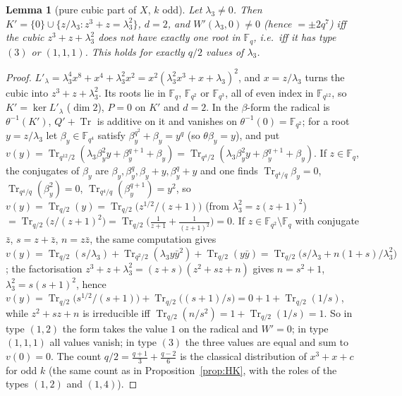 \documentclass[11pt,a4paper]{amsart}
\newtheorem{lemma}[theorem]{Lemma}
\theoremstyle{definition}
\newcommand{\F}{\mathbb{F}}
\newcommand{\Tr}{\operatorname{Tr}}
\begin{document}
\begin{lemma}[pure cubic part of $X$, $k$ odd]\label{lem:Wpcubic}
Let $\lambda_3\ne0$. Then $K'=\{0\}\cup\{z/\lambda_3:z^3+z=\lambda_3^2\}$, $d=2$, and $W'(\lambda_3,0)\ne0$ (hence $=\pm2q^7$) iff the cubic $z^3+z+\lambda_3^2$ does \emph{not} have exactly one root in $\F_q$, i.e.\ iff it has type $(3)$ or $(1,1,1)$. This holds for exactly $q/2$ values of $\lambda_3$.
\end{lemma}
\begin{proof}
$L'_\lambda=\lambda_3^4x^8+x^4+\lambda_3^2x^2=x^2(\lambda_3^2x^3+x+\lambda_3)^2$, and $x=z/\lambda_3$ turns the cubic into $z^3+z+\lambda_3^2$. Its roots lie in $\F_q$, $\F_{q^2}$ or $\F_{q^3}$, all of even index in $\F_{q^{12}}$, so $K'=\ker L'_\lambda$ ($\dim2$), $P=0$ on $K'$ and $d=2$. In the $\beta$-form the radical is $\theta^{-1}(K')$, $Q'+\Tr$ is additive on it and vanishes on $\theta^{-1}(0)=\F_{q^2}$; for a root $y=z/\lambda_3$ let $\beta_y\in\F_{q^4}$ satisfy $\beta_y^{q^2}+\beta_y=y^q$ (so $\theta\beta_y=y$), and put $v(y)=\Tr_{q^{12}/2}(\lambda_3\beta_y^2y+\beta_y^{q+1}+\beta_y)=\Tr_{q^4/2}(\lambda_3\beta_y^2y+\beta_y^{q+1}+\beta_y)$. If $z\in\F_q$, the conjugates of $\beta_y$ are $\beta_y,\beta_y^q,\beta_y+y,\beta_y^q+y$ and one finds $\Tr_{q^4/q}\beta_y=0$, $\Tr_{q^4/q}(\beta_y^2)=0$, $\Tr_{q^4/q}(\beta_y^{q+1})=y^2$, so $v(y)=\Tr_{q/2}(y)=\Tr_{q/2}\bigl(z^{1/2}/(z+1)\bigr)$ (from $\lambda_3^2=z(z+1)^2$) $=\Tr_{q/2}\bigl(z/(z+1)^2\bigr)=\Tr_{q/2}\bigl(\tfrac1{z+1}+\tfrac1{(z+1)^2}\bigr)=0$. If $z\in\F_{q^2}\setminus\F_q$ with conjugate $\bar z$, $s=z+\bar z$, $n=z\bar z$, the same computation gives $v(y)=\Tr_{q/2}(s/\lambda_3)+\Tr_{q^2/2}(\lambda_3y\bar y^2)+\Tr_{q/2}(y\bar y)=\Tr_{q/2}\bigl(s/\lambda_3+n(1+s)/\lambda_3^2\bigr)$; the factorisation $z^3+z+\lambda_3^2=(z+s)(z^2+sz+n)$ gives $n=s^2+1$, $\lambda_3^2=s(s+1)^2$, hence $v(y)=\Tr_{q/2}\bigl(s^{1/2}/(s+1)\bigr)+\Tr_{q/2}\bigl((s+1)/s\bigr)=0+1+\Tr_{q/2}(1/s)$, while $z^2+sz+n$ is irreducible iff $\Tr_{q/2}(n/s^2)=1+\Tr_{q/2}(1/s)=1$. So in type $(1,2)$ the form takes the value $1$ on the radical and $W'=0$; in type $(1,1,1)$ all values vanish; in type $(3)$ the three values are equal and sum to $v(0)=0$. The count $q/2=\frac{q+1}3+\frac{q-2}6$ is the classical distribution of $x^3+x+c$ for odd $k$ (the same count as in Proposition~\ref{prop:HK}, with the roles of the types $(1,2)$ and $(1,4)$).
\end{proof}
\end{document}

